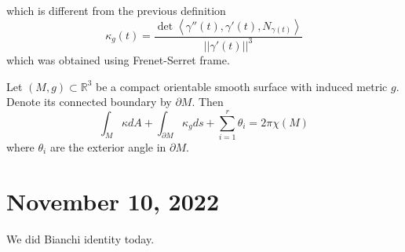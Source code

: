 \documentclass[12pt,a4paper]{article}
\theoremstyle{definition}
\theoremstyle{greenbox}
\newcommand{\R}{\mathbb{R}}
\begin{document}
    which is different from the previous definition 
    \[ \kappa_{g}(t) = \frac{\det \left< \gamma''(t), \gamma'(t), N_{\gamma(t)} \right>}{||\gamma'(t)||^{3}} \]
    which was obtained using Frenet-Serret frame.

    \begin{thm}
        Let $ (M,g)  \subset \R^{3}$ be a compact orientable smooth surface with induced metric $ g $. Denote its connected boundary  by $ \partial M $. Then 
        \[ \int_{M}\kappa dA + \int_{ \partial M} \kappa_{g}ds + \sum_{i=1}^{r} \theta_{i}  = 2 \pi \chi(M)\]
        where $ \theta_{i} $ are the exterior angle in $ \partial M $.
    \end{thm}

    \section{November 10, 2022}

    We did Bianchi identity today. 
\end{document}
